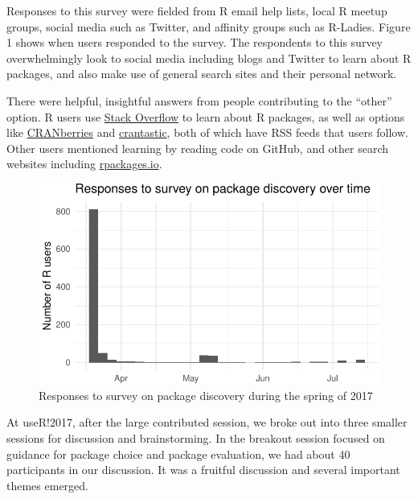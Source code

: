 Responses to this survey were fielded from R email help lists, local R
meetup groups, social media such as Twitter, and affinity groups such as
R-Ladies. Figure 1 shows when users responded to the survey. The
respondents to this survey overwhelmingly look to social media including
blogs and Twitter to learn about R packages, and also make use of
general search sites and their personal network.

There were helpful, insightful answers from people contributing to the
``other'' option. R users use
\href{https://stackoverflow.com/questions/tagged/r}{Stack Overflow} to
learn about R packages, as well as options like
\href{http://dirk.eddelbuettel.com/cranberries/}{CRANberries} and
\href{http://www.crantastic.org/}{crantastic}, both of which have RSS
feeds that users follow. Other users mentioned learning by reading code
on GitHub, and other search websites including
\href{http://rpackages.io/}{rpackages.io}.

\begin{Schunk}
\begin{figure}
\includegraphics{navigating_files/figure-latex/survey_time-1} \caption[Responses to survey on package discovery during the spring of 2017]{Responses to survey on package discovery during the spring of 2017}\label{fig:survey_time}
\end{figure}
\end{Schunk}

At useR!2017, after the large contributed session, we broke out into
three smaller sessions for discussion and brainstorming. In the breakout
session focused on guidance for package choice and package evaluation,
we had about 40 participants in our discussion. It was a fruitful
discussion and several important themes emerged.

